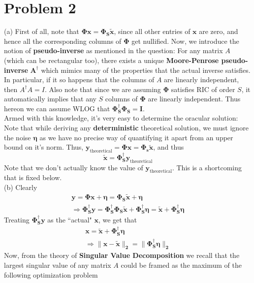\documentclass[a4paper,11pt]{article}
\numberwithin{definition}{section}
\numberwithin{mytheorem}{subsection}
\begin{document}
\section{Problem 2}
(a) First of all, note that $\boldsymbol{\Phi x = \Phi_S\widetilde{x}}$, since all other entries of $\boldsymbol{x}$ are zero, and hence all the corresponding columns of $\boldsymbol{\Phi}$ get nullified. Now, we introduce the notion of \textbf{pseudo-inverse} as mentioned in the question: For any matrix $A$ (which can be rectangular too), there exists a unique \textbf{Moore-Penrose pseudo-inverse} $\boldsymbol{A^{\dagger}}$ which mimics many of the properties that the actual inverse satisfies. In particular, if it so happens that the columns of $A$ are linearly independent, then $A^{\dagger}A = I$. Also note that since we are assuming $\boldsymbol{\Phi}$ satisfies RIC of order $S$, it automatically implies that any $S$ columns of $\boldsymbol{\Phi}$ are linearly independent. Thus hereon we can assume WLOG that $\boldsymbol{\Phi^{\dagger}_S\Phi_S = I}$.\\
Armed with this knowledge, it's very easy to determine the oracular solution: Note that while deriving any \textbf{deterministic} theoretical solution, we must ignore the noise $\boldsymbol{\eta}$ as we have no precise way of quantifying it apart from an upper bound on it's norm. Thus, $\boldsymbol{y_{\mathrm{theoretical}} = \Phi x = \Phi_s \widetilde{x}}$, and thus 
$$\boldsymbol{\widetilde{x} = \Phi_S^{\dagger}y_{\mathrm{theoretical}}}$$
Note that we don't actually know the value of $\boldsymbol{y_{\mathrm{theoretical}}}$. This is a shortcoming that is fixed below.
\\
(b) Clearly 
\begin{gather*}
\boldsymbol{y = \Phi x + \eta = \Phi_S\widetilde{x} + \eta} \\
\Rightarrow \boldsymbol{\Phi^{\dagger}_S y = \Phi_S^{\dagger}\Phi_S \widetilde{x} + \Phi_S^{\dagger}\eta = \widetilde{x} + \Phi_S^{\dagger}\eta}
\end{gather*}
Treating $\boldsymbol{\Phi^{\dagger}_S y}$ as the ``actual" $\boldsymbol{x}$, we get that 
\begin{gather*}
    \boldsymbol{x = \widetilde{x} + \Phi^{\dagger}_S\eta}\\
    \Rightarrow\boldsymbol{\lVert x-\widetilde{x}\rVert_2 = \lVert\Phi_S^{\dagger}\eta\rVert_2 }
\end{gather*}
Now, from the theory of \textbf{Singular Value Decomposition} we recall that the largest singular value of any matrix $A$ could be framed as the maximum of the following optimization problem
\end{document}
